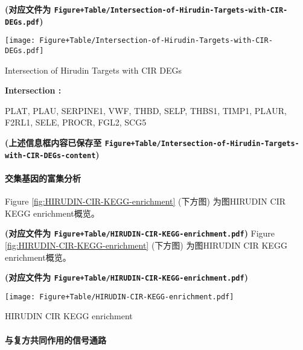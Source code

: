\documentclass[
]{article}
\begin{document}
\textbf{(对应文件为 \texttt{Figure+Table/Intersection-of-Hirudin-Targets-with-CIR-DEGs.pdf})}

\def\@captype{figure}
\begin{center}
\texttt{[image: Figure+Table/Intersection-of-Hirudin-Targets-with-CIR-DEGs.pdf]}
\caption{Intersection of Hirudin Targets with CIR DEGs}\label{fig:Intersection-of-Hirudin-Targets-with-CIR-DEGs}
\end{center}
\begin{center}\begin{tcolorbox}[colback=gray!10, colframe=gray!50, width=0.9\linewidth, arc=1mm, boxrule=0.5pt]
\textbf{
Intersection
:}

\vspace{0.5em}

    PLAT, PLAU, SERPINE1, VWF, THBD, SELP, THBS1, TIMP1,
PLAUR, F2RL1, SELE, PROCR, FGL2, SCG5

\vspace{2em}
\end{tcolorbox}
\end{center}

\textbf{(上述信息框内容已保存至 \texttt{Figure+Table/Intersection-of-Hirudin-Targets-with-CIR-DEGs-content})}

\hypertarget{ux4ea4ux96c6ux57faux56e0ux7684ux5bccux96c6ux5206ux6790}{%
\paragraph{交集基因的富集分析}\label{ux4ea4ux96c6ux57faux56e0ux7684ux5bccux96c6ux5206ux6790}}

Figure \ref{fig:HIRUDIN-CIR-KEGG-enrichment} (下方图) 为图HIRUDIN CIR KEGG enrichment概览。

\textbf{(对应文件为 \texttt{Figure+Table/HIRUDIN-CIR-KEGG-enrichment.pdf})}
Figure \ref{fig:HIRUDIN-CIR-KEGG-enrichment} (下方图) 为图HIRUDIN CIR KEGG enrichment概览。

\textbf{(对应文件为 \texttt{Figure+Table/HIRUDIN-CIR-KEGG-enrichment.pdf})}

\def\@captype{figure}
\begin{center}
\texttt{[image: Figure+Table/HIRUDIN-CIR-KEGG-enrichment.pdf]}
\caption{HIRUDIN CIR KEGG enrichment}\label{fig:HIRUDIN-CIR-KEGG-enrichment}
\end{center}

\hypertarget{ux4e0eux590dux65b9ux5171ux540cux4f5cux7528ux7684ux4fe1ux53f7ux901aux8def}{%
\paragraph{与复方共同作用的信号通路}\label{ux4e0eux590dux65b9ux5171ux540cux4f5cux7528ux7684ux4fe1ux53f7ux901aux8def}}
\end{document}
